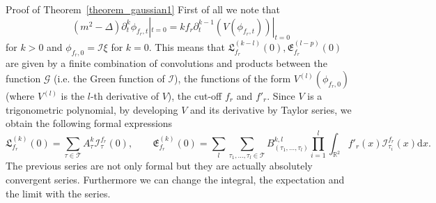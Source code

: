 \documentclass[a4paper,10pt]{article}
\newcommand{\mathd}{\mathrm{d}}
\newenvironment{proof*}[1]{\noindent\textbf{#1\ }}{\hspace*{\fill}$\Box$\medskip}
\begin{document}
\begin{proof*}{Proof of Theorem~\ref{theorem_gaussian1}}
  First of all we note that
  \begin{equation}
    (m^2 - \Delta) \partial^k_t \phi_{f_r, t} |_{t = 0} = k f_r \partial^{k -
    1}_t (V (\phi_{f_r, t})) |_{t = 0} \label{equationcutoff4}
  \end{equation}
  for $k > 0$ and $\phi_{f_r, 0} =\mathcal{I} \xi$ for $k = 0$. This means
  that $\mathfrak{L}^{(k - l)}_{f_r} (0), \mathfrak{E}^{(l - p)}_{f_r} (0)$
  are given by a finite combination of convolutions and products between the
  function $\mathcal{G}$ (i.e. the Green function of $\mathcal{I}$), the
  functions of the form $V^{(l)} (\phi_{f_r, 0})$ (where $V^{(l)}$ is the
  $l$-th derivative of $V$), the cut-off $f_r$ and $f'_r$. Since $V$ is a
  trigonometric polynomial, by developing $V$ and its derivative by Taylor
  series, we obtain the following formal expressions
  \begin{equation}
    \mathfrak{L}^{(k)}_{f_r} (0) = \sum_{\tau \in \mathcal{T}} A^k_{\tau}
    \mathcal{I}_{\tau}^{f_r} (0), \qquad \mathfrak{E}^{(k)}_{f_r} (0) = \sum_l
    \sum_{\tau_1, \ldots, \tau_l \in \mathcal{T}} B^{k, l}_{(\tau_1, \ldots,
    \tau_l)} \prod_{i = 1}^l \int_{\mathbb{R}^2} f'_r (x)
    \mathcal{I}_{\tau_i}^{f_r} (x) \mathd x. \label{equationcutoff5}
  \end{equation}
  The previous series are not only formal but they are actually absolutely
  convergent series. Furthermore we can change the integral, the expectation
  and the limit with the series.
  

\end{proof*}
\end{document}
